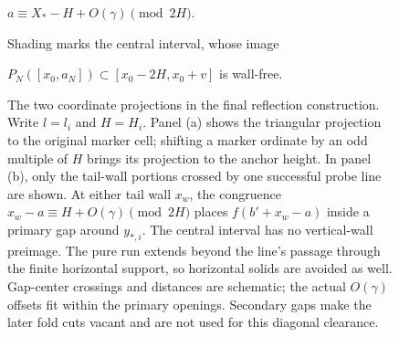 \begin{figure}[tbp]
\begin{minipage}[t]{0.54\linewidth}
\par\smallskip
{\small
$\displaystyle a\equiv X_*-H+O(\gamma)\pmod{2H}.$\par
Shading marks the central interval, whose image\par
$P_N([x_0,a_N])\subset[x_0-2H,x_0+v]$ is wall-free.}
\end{minipage}
\caption{The two coordinate projections in the final reflection construction.
Write $l=l_i$ and $H=H_i$.
Panel (a) shows the triangular projection to the original marker cell;
shifting a marker ordinate by an odd multiple of $H$ brings its projection
to the anchor height. In panel (b), only the tail-wall portions crossed by
one successful probe line are shown. At either tail wall $x_w$, the
congruence $x_w-a\equiv H+O(\gamma)\pmod{2H}$ places
$f(b'+x_w-a)$ inside a primary gap around $y_{*,i}$. The central
interval has no vertical-wall preimage. The pure run extends beyond the
line's passage through the finite horizontal support, so horizontal
solids are avoided as well. Gap-center crossings and distances are
schematic; the actual $O(\gamma)$ offsets fit within the primary openings.
Secondary gaps make the later fold cuts vacant and are not used for this
diagonal clearance.}
\label{fig:reflection-template-projections}
\end{figure}
